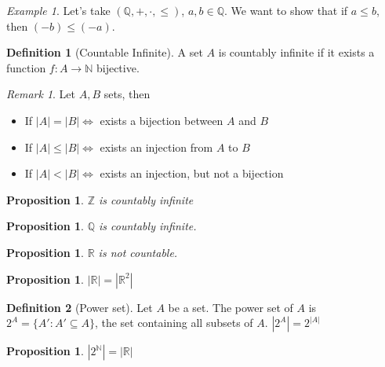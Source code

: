 \documentclass{article}
\newcommand{\fToN}[2]{#1 : #2 \rightarrow \mathbb{N}}
\theoremstyle{definition}
\newtheorem{definition}{Definition}[section]
\theoremstyle{definition}
\theoremstyle{plain}
\theoremstyle{plain}
\theoremstyle{plain}
\theoremstyle{plain}
\newtheorem{proposition}[theorem]{Proposition}
\theoremstyle{definition}
\theoremstyle{remark}
\newtheorem{exampled}{Example}[definition]
\theoremstyle{remark}
\theoremstyle{remark}
\theoremstyle{remark}
\newtheorem*{remark}{Remark}
\newcommand{\N}{\mathbb{N}}
\newcommand{\Z}{\mathbb{Z}}
\newcommand{\Q}{\mathbb{Q}}
\newcommand{\R}{\mathbb{R}}
\begin{document}
\begin{exampled}
  Let's take $(\Q, +, \cdot, \leq)$, $a, b \in \Q$. We want to show that if $a \leq b$, then $(-b) \leq (-a)$.
\end{exampled}



\begin{definition}[Countable Infinite]
  A set $A$ is countably infinite if it exists a function $\fToN{f}{A}$ bijective.
\end{definition}

\begin{remark}
  Let $A, B$ sets, then
  \begin{itemize}
  \item If $|A| = |B| \iff$ exists a bijection between $A$ and $B$
  \item If $|A| \leq |B| \iff$ exists an injection from $A$ to $B$
  \item If $|A| < |B| \iff$ exists an injection, but not a bijection
  \end{itemize}
\end{remark}


\begin{proposition}
  $\Z$ is countably infinite
\end{proposition}



\begin{proposition}
  $\Q$ is countably infinite.
\end{proposition}



\begin{proposition}
  $\R$ is not countable.
\end{proposition}



\begin{proposition}
  $|\R| = |\R^2|$
\end{proposition}


\begin{definition}[Power set]
  Let $A$ be a set. The power set of $A$ is $2^A = \{ A' : A' \subseteq A \}$, the set containing all subsets of $A$. $|2^A| = 2^{|A|}$
\end{definition}


\begin{proposition}
  $|2^{\N}| = |\R|$
\end{proposition}
\end{document}
